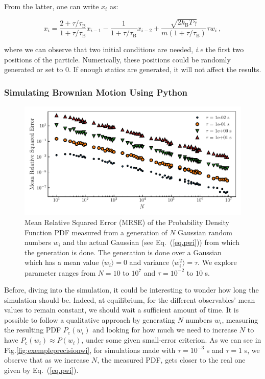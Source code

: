 From the latter, one can write $x_i$ as:

\begin{equation} 
	x_i = \frac{2 + \tau /\tau_\mathrm{B}}{1 + \tau / \tau_\mathrm{B} } x_{i-1} 
	- \frac{1}{1 + \tau / \tau_\mathrm{B}}x_{i-2}
	+ \frac{\sqrt{2k_\mathrm{B}T\gamma}}{m(1 + \tau/\tau_\mathrm{B})} \tau w_i ~,
	\label{Eq.numfulllangevin}
\end{equation}

where we can observe that two initial conditions are needed, \textit{i.e} the first two positions of the particle. Numerically, these positions could be randomly generated or  set to $0$. If enough statics are generated, it will not affect the results.

\subsubsection{Simulating Brownian Motion Using Python}

\begin{figure}[h]
	\centering
	\includegraphics{02_body/chapter1/image/noise_simulation/MSE.pdf}
	\caption{Mean Relative Squared Error (\gls{MRSE}) of the Probability Density Function \gls{PDF} measured from a generation of $N$ Gaussian random numbers $w_i$ and the actual Gaussian (see Eq.~(\ref{eq.pwi})) from which the generation is done. The generation is done over a Gaussian which has a mean value $\langle w_i \rangle =0$ and variance $\langle w_i^2 \rangle = \tau$. We explore parameter ranges from $N = 10$ to $10^7$ and $\tau = 10^{-2}$ to $10$ s. \href{https://github.com/eXpensia/Confined-Brownian-Motion/blob/main/02_body/chapter1/image/noise_simulation/noise_simulation.ipynb}{\faGithub}}  
	\label{fig:MSEwi}
\end{figure}

Before, diving into the simulation, it could be interesting to wonder how long the simulation should be. Indeed, at equilibrium, for the different observables' mean values to remain constant, we should wait a sufficient amount of time. It is possible to follow a qualitative approach by generating $N$ numbers $w_i$, measuring the resulting \gls{PDF} $P_\mathrm{c}(w_i)$ and looking for how much we need to increase $N$ to have $P_\mathrm{c}(w_i) \approx P(w_i)$, under some given small-error criterion. As we can see in Fig.\ref{fig:exempleprecisionwi}, for simulations made with $\tau = 10^{-3}$ s and $\tau = 1$ s, we observe that as we increase $N$, the measured PDF, gets closer to the real one given by Eq.~(\ref{eq.pwi}). 




